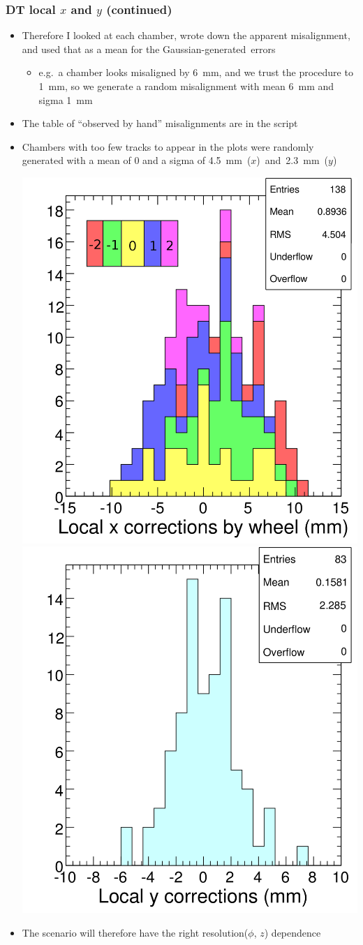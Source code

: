 \documentclass[compress]{beamer}
\begin{document}
\begin{frame}
\frametitle{DT local $x$ and $y$ (continued)}
\begin{itemize}
\item Therefore I looked at each chamber, wrote down the apparent
  misalignment, and used that as a mean for the \mbox{Gaussian-generated errors\hspace{-1 cm}}
\begin{itemize}
\item e.g.\ a chamber looks misaligned by 6~mm, and we trust the
  procedure to 1~mm, so we generate a random misalignment with mean
  6~mm and sigma 1~mm
\end{itemize}
\item The table of ``observed by hand'' misalignments are in the script
\item Chambers with too few tracks to appear in the plots were
  randomly generated with a mean of 0 and a sigma of \mbox{4.5~mm ($x$) and 2.3~mm ($y$)\hspace{-1 cm}}
\begin{center}
\includegraphics[width=0.3\linewidth]{report2_xbywheel.png} \includegraphics[width=0.3\linewidth]{report2_y.png}
\end{center}

\item The scenario will therefore have the right resolution($\phi$, $z$) \mbox{dependence\hspace{-1 cm}}
\end{itemize}
\end{frame}
\end{document}
